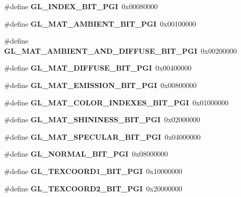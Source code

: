 \begin{DoxyCompactItemize}
\item 
\#define {\bfseries G\+L\+\_\+\+I\+N\+D\+E\+X\+\_\+\+B\+I\+T\+\_\+\+P\+G\+I}~0x00080000\label{_s_d_l__opengl_8h_a73d1c369ecaf5cd3be043ea12438ec02}

\item 
\#define {\bfseries G\+L\+\_\+\+M\+A\+T\+\_\+\+A\+M\+B\+I\+E\+N\+T\+\_\+\+B\+I\+T\+\_\+\+P\+G\+I}~0x00100000\label{_s_d_l__opengl_8h_a6ec850f51c10198c9f309c3d8b9f7982}

\item 
\#define {\bfseries G\+L\+\_\+\+M\+A\+T\+\_\+\+A\+M\+B\+I\+E\+N\+T\+\_\+\+A\+N\+D\+\_\+\+D\+I\+F\+F\+U\+S\+E\+\_\+\+B\+I\+T\+\_\+\+P\+G\+I}~0x00200000\label{_s_d_l__opengl_8h_acc84e98e84fa424dc5cf6f6271066c5e}

\item 
\#define {\bfseries G\+L\+\_\+\+M\+A\+T\+\_\+\+D\+I\+F\+F\+U\+S\+E\+\_\+\+B\+I\+T\+\_\+\+P\+G\+I}~0x00400000\label{_s_d_l__opengl_8h_a42116e6cab70ff073fecc93b3f2af9dd}

\item 
\#define {\bfseries G\+L\+\_\+\+M\+A\+T\+\_\+\+E\+M\+I\+S\+S\+I\+O\+N\+\_\+\+B\+I\+T\+\_\+\+P\+G\+I}~0x00800000\label{_s_d_l__opengl_8h_a7f07172da246fa92788495c4a58a47d3}

\item 
\#define {\bfseries G\+L\+\_\+\+M\+A\+T\+\_\+\+C\+O\+L\+O\+R\+\_\+\+I\+N\+D\+E\+X\+E\+S\+\_\+\+B\+I\+T\+\_\+\+P\+G\+I}~0x01000000\label{_s_d_l__opengl_8h_a9bd98e7b1d959505b66aefe7fa1c1112}

\item 
\#define {\bfseries G\+L\+\_\+\+M\+A\+T\+\_\+\+S\+H\+I\+N\+I\+N\+E\+S\+S\+\_\+\+B\+I\+T\+\_\+\+P\+G\+I}~0x02000000\label{_s_d_l__opengl_8h_adb03fd592f6fb520fcaca8fed29f5283}

\item 
\#define {\bfseries G\+L\+\_\+\+M\+A\+T\+\_\+\+S\+P\+E\+C\+U\+L\+A\+R\+\_\+\+B\+I\+T\+\_\+\+P\+G\+I}~0x04000000\label{_s_d_l__opengl_8h_a10192f4dd4f4cdba4f8588ea1ed49a91}

\item 
\#define {\bfseries G\+L\+\_\+\+N\+O\+R\+M\+A\+L\+\_\+\+B\+I\+T\+\_\+\+P\+G\+I}~0x08000000\label{_s_d_l__opengl_8h_a57b5d29d9c0b8aa51c492fa5db4de4f0}

\item 
\#define {\bfseries G\+L\+\_\+\+T\+E\+X\+C\+O\+O\+R\+D1\+\_\+\+B\+I\+T\+\_\+\+P\+G\+I}~0x10000000\label{_s_d_l__opengl_8h_ad13b926bfef685f2ab8f39609273c5cc}

\item 
\#define {\bfseries G\+L\+\_\+\+T\+E\+X\+C\+O\+O\+R\+D2\+\_\+\+B\+I\+T\+\_\+\+P\+G\+I}~0x20000000\label{_s_d_l__opengl_8h_a43296f075b84e5fe6ff5d52e093021c9}


\end{DoxyCompactItemize}
